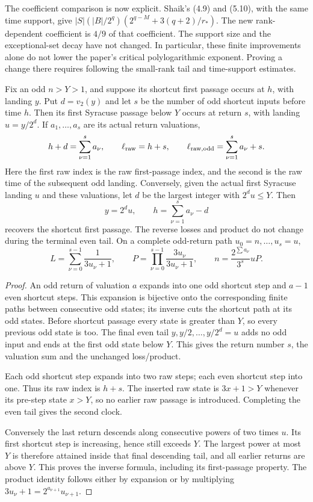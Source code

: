 The coefficient comparison is now explicit. Shaik's (4.9) and (5.10),
with the same time support, give
\(|S|(|B|/2^q)(2^{q-M}+3(q+2)/r_*)\).
The new rank-dependent coefficient is \(4/9\) of that coefficient.
The support size and the exceptional-set decay have not changed.
In particular, these finite improvements alone do not lower the
paper's critical polylogarithmic exponent. Proving a change there
requires following the small-rank tail and time-support estimates.

\begin{proposition}
\label{prop:Shaik-clock-map}
Fix an odd \(n>Y>1\), and suppose its shortcut first passage occurs at
\(h\), with landing \(y\). Put \(d=v_2(y)\) and let \(s\) be the
number of odd shortcut inputs before time \(h\). Then its first
Syracuse passage below \(Y\) occurs at return \(s\), with landing
\(u=y/2^d\). If \(a_1,\ldots,a_s\) are its actual return valuations,
\begin{equation}\label{eq:Shaik-clock-map}
 h+d=\sum_{\nu=1}^s a_\nu,\qquad
 \ell_{\rm raw}=h+s,\qquad
 \ell_{\rm raw,odd}=\sum_{\nu=1}^s a_\nu+s.
\end{equation}
Here the first raw index is the raw first-passage index, and the
second is the raw time of the subsequent odd landing.
Conversely, given the actual first Syracuse landing \(u\) and
these valuations, let \(d\) be the largest integer with \(2^du\le Y\).
Then
\[
 y=2^du,\qquad h=\sum_{\nu=1}^s a_\nu-d
\]
recovers the shortcut first passage.
The reverse losses and product do not change during the terminal
even tail. On a complete odd-return path \(u_0=n,\ldots,u_s=u\),
\[
 L=\sum_{\nu=0}^{s-1}\frac1{3u_\nu+1},\qquad
 P=\prod_{\nu=0}^{s-1}\frac{3u_\nu}{3u_\nu+1},\qquad
 n=\frac{2^{\sum a_\nu}}{3^s}uP.
\]
\end{proposition}
\begin{proof}
An odd return of valuation \(a\) expands into one odd shortcut step
and \(a-1\) even shortcut steps. This expansion is bijective onto the
corresponding finite paths between consecutive odd states; its inverse
cuts the shortcut path at its odd states. Before shortcut passage
every state is greater than \(Y\), so every previous odd state is too.
The final even tail \(y,y/2,\ldots,y/2^d=u\) adds no odd input and
ends at the first odd state below \(Y\). This gives the return number
\(s\), the valuation sum and the unchanged loss/product.

Each odd shortcut step expands into two raw steps; each even shortcut
step into one. Thus its raw index is \(h+s\). The inserted raw state
is \(3x+1>Y\) whenever its pre-step state \(x>Y\), so no earlier raw
passage is introduced. Completing the even tail gives the second clock.

Conversely the last return descends along consecutive powers of two
times \(u\). Its first shortcut step is increasing, hence still exceeds
\(Y\). The largest power at most \(Y\) is therefore attained inside
that final descending tail, and all earlier returns are above \(Y\).
This proves the inverse formula, including its first-passage property.
The product identity follows either by expansion or by multiplying
\(3u_\nu+1=2^{a_{\nu+1}}u_{\nu+1}\).
\end{proof}

